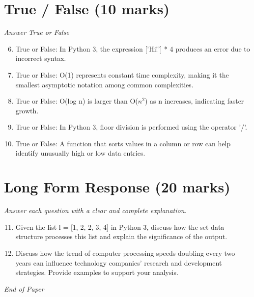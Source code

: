\documentclass[12pt]{article}
\begin{document}
\section*{True / False (10 marks)}
\textit{Answer True or False}
\begin{enumerate}[label=\arabic*.]
\setcounter{enumi}{5}
\item True or False: In Python 3, the expression ['Hi!'] * 4 produces an error due to incorrect syntax.
\item True or False: O(1) represents constant time complexity, making it the smallest asymptotic notation among common complexities.
\item True or False: O(log n) is larger than O($n^2$) as n increases, indicating faster growth.
\item True or False: In Python 3, floor division is performed using the operator '/'.
\item True or False: A function that sorts values in a column or row can help identify unusually high or low data entries.
\end{enumerate}

\section*{Long Form Response (20 marks)}
\textit{Answer each question with a clear and complete explanation.}
\begin{enumerate}[label=\arabic*.]
\setcounter{enumi}{10}
\item Given the list l = [1, 2, 2, 3, 4] in Python 3, discuss how the set data structure processes this list and explain the significance of the output.
\item Discuss how the trend of computer processing speeds doubling every two years can influence technology companies' research and development strategies. Provide examples to support your analysis.
\end{enumerate}

\vfill
\noindent\textit{End of Paper}
\end{document}

